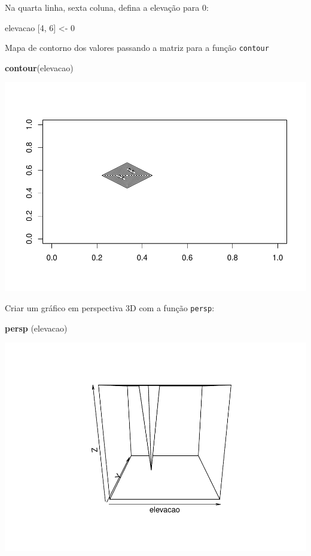\documentclass[]{book}
\newenvironment{Shaded}{\begin{snugshade}}{\end{snugshade}}
\newcommand{\DecValTok}[1]{\textcolor[rgb]{0.00,0.00,0.81}{#1}}
\newcommand{\KeywordTok}[1]{\textcolor[rgb]{0.13,0.29,0.53}{\textbf{#1}}}
\newcommand{\NormalTok}[1]{#1}
\newcommand{\StringTok}[1]{\textcolor[rgb]{0.31,0.60,0.02}{#1}}
\begin{document}
Na quarta linha, sexta coluna, defina a elevação para 0:

\begin{Shaded}
\begin{Highlighting}[]
\NormalTok{elevacao [}\DecValTok{4}\NormalTok{, }\DecValTok{6}\NormalTok{] <-}\StringTok{ }\DecValTok{0}
\end{Highlighting}
\end{Shaded}

Mapa de contorno dos valores passando a matriz para a função \texttt{contour}

\begin{Shaded}
\begin{Highlighting}[]
\KeywordTok{contour}\NormalTok{(elevacao)}
\end{Highlighting}
\end{Shaded}

\includegraphics{TudodoR_files/figure-latex/unnamed-chunk-71-1.pdf}

Criar um gráfico em perspectiva 3D com a função \texttt{persp}:

\begin{Shaded}
\begin{Highlighting}[]
\KeywordTok{persp}\NormalTok{ (elevacao)}
\end{Highlighting}
\end{Shaded}

\includegraphics{TudodoR_files/figure-latex/unnamed-chunk-72-1.pdf}
\end{document}
